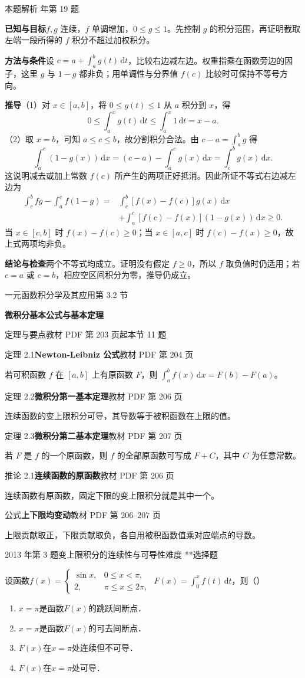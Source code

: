 \documentclass[UTF8,zihao=-4,fontset=fandol]{ctexart}
\newcommand{\SectionHeading}[4]{%
  \clearpage\hypertarget{sec-#1}{}%
  {\small\textcolor{accent}{#2\hfill 第 #1 节}}\par\medskip
  {\LARGE\bfseries #3}\par\smallskip
  {\small\textcolor{muted}{#4}}\par\bigskip}
\newcommand{\Theory}[4]{%
  {\small\textcolor{accent}{#1}\quad\textbf{#3}\hfill\textcolor{muted}{教材 PDF 第 #2 页}}\par
  {\small #4}\par\smallskip}
\newcommand{\pickout}{\hfill（\hspace{1.4em}）}
\newenvironment{abcd}{\begin{enumerate}[label=\textup{(\Alph*)},leftmargin=2.3em,itemsep=1pt,topsep=4pt,parsep=1pt]}{\end{enumerate}}
\newcounter{BankQuestion}
\newcommand{\QuestionPage}[7]{%
  \stepcounter{BankQuestion}%
  \par\noindent\begin{minipage}{\linewidth}
  \raggedright
  {\small\textcolor{black!60}{#3\quad #5\quad 难度 #7}\hfill\textcolor{accent}{#2}}\par\smallskip}
\newcommand{\QuestionEnd}{\end{minipage}\par\medskip}
\newcommand{\QuestionPage}[7]{%
  \clearpage
  \stepcounter{BankQuestion}%
  {\small\textcolor{accent}{#1\hfill #2}}\par\medskip
  {\small\textcolor{black!60}{#3\quad #5\quad 难度 #7\hfill \arabic{BankQuestion} / 234}}\par\vspace{9bp}}
\newcommand{\QuestionEnd}{}
\newenvironment{QuestionSolution}[1]{%
  \clearpage
  {\small\textcolor{black!60}{本题解析\quad #1}}\par\medskip
}{\par\clearpage}
\begin{document}
\begin{QuestionSolution}{2014 年第 19 题}
\textbf{已知与目标}\quad \(f,g\) 连续，\(f\) 单调增加，\(0\le g\le1\)。先控制 \(g\) 的积分范围，再证明截取左端一段所得的 \(f\) 积分不超过加权积分。

\textbf{方法与条件}\quad 设 \(c=a+\int_a^b g(t)\,\mathrm{d}t\)，比较右边减左边。权重指乘在函数旁边的因子，这里 \(g\) 与 \(1-g\) 都非负；用单调性与分界值 \(f(c)\) 比较时可保持不等号方向。

\textbf{推导}\quad （1）对 \(x\in[a,b]\)，将 \(0\le g(t)\le1\) 从 \(a\) 积分到 \(x\)，得
\[
0\le\int_a^xg(t)\,\mathrm{d}t\le\int_a^x1\,\mathrm{d}t=x-a.
\]
（2）取 \(x=b\)，可知 \(a\le c\le b\)，故分割积分合法。由 \(c-a=\int_a^b g\) 得
\[
\int_a^c(1-g(x))\,\mathrm{d}x
=(c-a)-\int_a^cg(x)\,\mathrm{d}x=\int_c^bg(x)\,\mathrm{d}x.
\]
这说明减去或加上常数 \(f(c)\) 所产生的两项正好抵消。因此所证不等式右边减左边为
\[
\begin{aligned}
\int_c^b f g-\int_a^c f(1-g)
={}&\int_c^b [f(x)-f(c)]g(x)\,\mathrm{d}x\\
&+\int_a^c [f(c)-f(x)](1-g(x))\,\mathrm{d}x\ge0 .
\end{aligned}
\]
当 \(x\in[c,b]\) 时 \(f(x)-f(c)\ge0\)；当 \(x\in[a,c]\) 时 \(f(c)-f(x)\ge0\)，故上式两项均非负。

\textbf{结论与检查}\quad 两个不等式均成立。证明没有假定 \(f\ge0\)，所以 \(f\) 取负值时仍适用；若 \(c=a\) 或 \(c=b\)，相应空区间积分为零，推导仍成立。
\end{QuestionSolution}

\SectionHeading{3.2}{一元函数积分学及其应用}{微积分基本公式与基本定理}{定理与要点\quad 教材 PDF 第 203 页起\hfill 本节 11 题}
\Theory{定理 2.1}{204}{Newton-Leibniz 公式}{若可积函数 \(f\) 在 \([a,b]\) 上有原函数 \(F\)，则 \(\int_a^b f(x)\,\mathrm{d}x=F(b)-F(a)\)。}
\Theory{定理 2.2}{206}{微积分第一基本定理}{连续函数的变上限积分可导，其导数等于被积函数在上限的值。}
\Theory{定理 2.3}{207}{微积分第二基本定理}{若 \(F\) 是 \(f\) 的一个原函数，则 \(f\) 的全部原函数可写成 \(F+C\)，其中 \(C\) 为任意常数。}
\Theory{推论 2.1}{206}{连续函数的原函数}{连续函数有原函数，固定下限的变上限积分就是其中一个。}
\Theory{公式}{206--207}{上下限均变动}{上限贡献取正，下限贡献取负，各自用被积函数值乘对应端点的导数。}
\QuestionPage{3.2 微积分基本公式与基本定理}{选择题}{2013 年第 3 题}{1}{变上限积分的连续性与可导性}{142 / 234}{**}
设函数$f(x) = \begin{cases}
  \sin x, & 0 \le x < \pi , \\
       2, & \pi \le x \le 2\pi ,
\end{cases}$ $F(x) = \int_0^x f(t) \,\mathrm{d} t$，则\pickout{}
\begin{abcd}
\item $x = \pi$是函数$F(x)$的跳跃间断点．
\item $x = \pi$是函数$F(x)$的可去间断点．
\item $F(x)$在$x = \pi$处连续但不可导．
\item $F(x)$在$x = \pi$处可导．
\end{abcd}
\QuestionEnd
\end{document}
